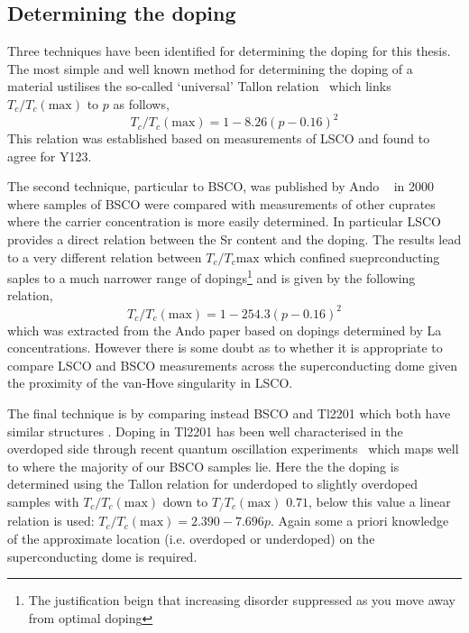 \subsection{Determining the doping}

Three techniques have been identified for determining the doping for this thesis. The most simple and well known method for determining the doping of a material ustilises the so-called `universal' Tallon relation~\cite{Presland1991} which links $T_c/T_c(\textrm{max})$ to $p$ as follows,
\begin{equation}
\label{Eqn:ExpH:TallonRelation}
T_c/T_c(\textrm{max}) = 1 - 8.26 (p - 0.16)^2
\end{equation}
This relation was established based on measurements of \ac{LSCO} and found to agree for \ac{Y123}.

The second technique, particular to \ac{BSCO}, was published by Ando \etal~\cite{Ando2000} in 2000 where samples of \ac{BSCO} were compared with measurements of other cuprates where the carrier concentration is more easily determined. In particular \acf{LSCO} provides a direct relation between the Sr content and the doping. The results lead to a very different relation between $T_c/T_c{\textrm{max}}$ which confined sueprconducting saples to a much narrower range of dopings\footnote{The justification beign that increasing disorder suppressed \Tc as you move away from optimal doping} and is given by the following relation,
\begin{equation}
\label{Eqn:Exp:AndoRelation}
T_c/T_c(\textrm{max}) = 1 - 254.3 (p - 0.16)^2
\end{equation}
which was extracted from the Ando paper based on dopings determined by La concentrations. However there is some doubt as to whether it is appropriate to compare \ac{LSCO} and \ac{BSCO} measurements across the superconducting dome given the proximity of the van-Hove singularity in \ac{LSCO}.

The final technique is by comparing instead \ac{BSCO} and \ac{Tl2201} which both have similar structures . Doping in \ac{Tl2201} has been well characterised in the overdoped side through recent quantum oscillation experiments~\cite{Bangura2010} which maps well to where the majority of our \ac{BSCO} samples lie. Here the the doping is determined using the Tallon relation for underdoped to slightly overdoped samples with $T_c/T_c(\textrm{max})$ down to $T_/T_c(\textrm{max})$ $0.71$, below this value a linear relation is used: $T_c/T_c(\textrm{max}) = 2.390 - 7.696p$. Again some a priori knowledge of the approximate location (i.e. overdoped or underdoped) on the superconducting dome is required.

